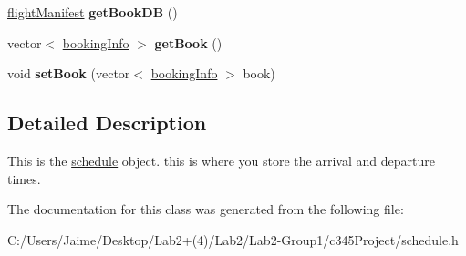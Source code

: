 \begin{DoxyCompactItemize}
\item 
\hypertarget{classschedule_a91534cc700c81dccee0e3594ca491be2}{
\hyperlink{classflight_manifest}{flightManifest} {\bfseries getBookDB} ()}
\label{classschedule_a91534cc700c81dccee0e3594ca491be2}

\item 
\hypertarget{classschedule_aa0d53d992e3b6f7efa312807ddb2e7fd}{
vector$<$ \hyperlink{classbooking_info}{bookingInfo} $>$ {\bfseries getBook} ()}
\label{classschedule_aa0d53d992e3b6f7efa312807ddb2e7fd}

\item 
\hypertarget{classschedule_a6036e45cfea7c909940e64951cd69926}{
void {\bfseries setBook} (vector$<$ \hyperlink{classbooking_info}{bookingInfo} $>$ book)}
\label{classschedule_a6036e45cfea7c909940e64951cd69926}

\end{DoxyCompactItemize}


\subsection{Detailed Description}
This is the \hyperlink{classschedule}{schedule} object. this is where you store the arrival and departure times. 

The documentation for this class was generated from the following file:\begin{DoxyCompactItemize}
\item 
C:/Users/Jaime/Desktop/Lab2+(4)/Lab2/Lab2-\/Group1/c345Project/schedule.h\end{DoxyCompactItemize}
